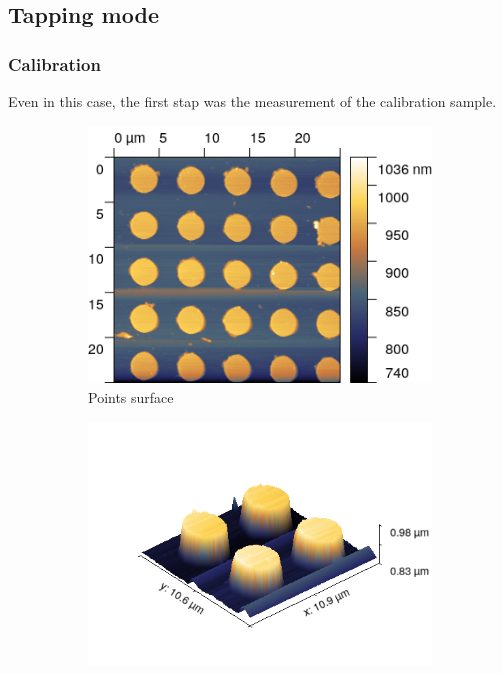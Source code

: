\documentclass[11pt,a4paper]{article}
\begin{document}
\subsection{Tapping mode}
\subsubsection{Calibration}
Even in this case, the first stap was the measurement of the calibration sample.

\begin{figure}[H]
\centering
\begin{subfigure}[b]{0.45\textwidth}
\includegraphics[width=\textwidth]{tm_points}
\caption{Points surface}
\label{fig:}
\end{subfigure}
\begin{subfigure}[b]{0.45\textwidth}
\includegraphics[width=\textwidth]{tm_points_3D}

\end{subfigure}
\end{figure}
\end{document}
